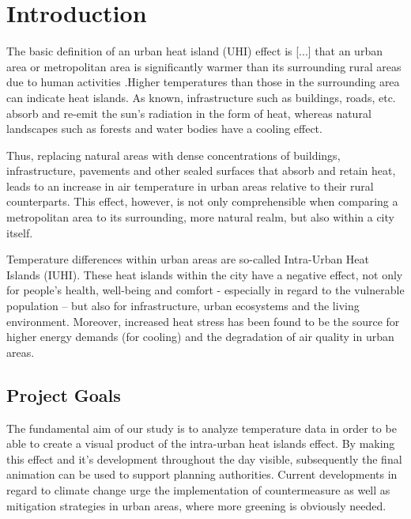 
\section{Introduction}

The basic definition of an urban heat island (UHI) effect is \ldq{}[...] that an urban area or metropolitan area is significantly warmer than its surrounding rural areas due to human activities\rdq{} \cite{takebayashi_chapter_2020}.Higher temperatures than those in the surrounding area can indicate heat islands. As known, infrastructure such as buildings, roads, etc. absorb and re-emit the sun’s radiation in the form of heat, whereas natural landscapes such as forests and water bodies have a cooling effect. \cite{us_epa_learn_2014}

Thus, replacing natural areas with dense concentrations of buildings, infrastructure, pavements and other sealed surfaces that absorb and retain heat, leads to an increase in air temperature in urban areas relative to their rural counterparts. This effect, however, is not only comprehensible when comparing a metropolitan area to its surrounding, more natural realm, but also within a city itself. 

Temperature differences within urban areas are so-called \ldq{}Intra-Urban Heat Islands (IUHI)\rdq{}. \cite{bruns_stable_2017}
These heat islands within the city have a negative effect, not only for people’s health, well-being and comfort - especially in regard to the vulnerable population – but also for infrastructure, urban ecosystems and the living environment. Moreover, increased heat stress has been found to be the source for higher energy demands (for cooling) and the degradation of air quality in urban areas. \cite{mohajerani_urban_2017}

\subsection{Project Goals}

The fundamental aim of our study is to analyze temperature data in order to be able to create a visual product of the intra-urban heat islands effect. By making this effect and it's development throughout the day visible, subsequently the final animation can be used to support planning authorities. Current developments in regard to climate change urge the implementation of countermeasure as well as mitigation strategies in urban areas, where more greening is obviously needed. \cite{ketterer_comparison_2015}

